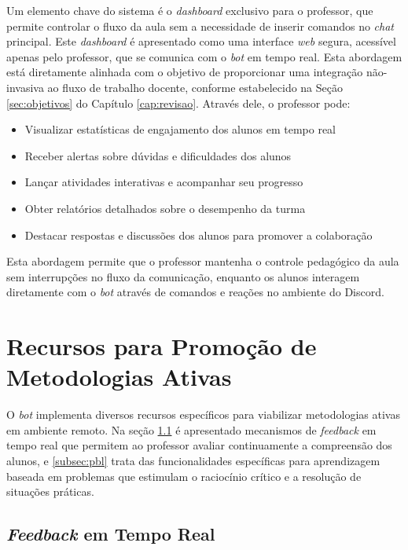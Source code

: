 Um elemento chave do sistema é o \textit{dashboard} exclusivo para o professor,
que permite controlar o fluxo da aula sem a necessidade de inserir comandos no
\textit{chat} principal. Este \textit{dashboard} é apresentado como uma
interface \textit{web} segura, acessível apenas pelo professor, que se comunica
com o \textit{bot} em tempo real. Esta abordagem está diretamente alinhada com o
objetivo de proporcionar uma integração não-invasiva ao fluxo de trabalho
docente, conforme estabelecido na Seção \ref{sec:objetivos} do Capítulo
\ref{cap:revisao}. Através dele, o professor pode:

\begin{itemize}
\item Visualizar estatísticas de engajamento dos alunos em tempo real
\item Receber alertas sobre dúvidas e dificuldades dos alunos
\item Lançar atividades interativas e acompanhar seu progresso
\item Obter relatórios detalhados sobre o desempenho da turma
\item Destacar respostas e discussões dos alunos para promover a colaboração
\end{itemize}

Esta abordagem permite que o professor mantenha o controle pedagógico da aula
sem interrupções no fluxo da comunicação, enquanto os alunos interagem
diretamente com o \textit{bot} através de comandos e reações no ambiente do
Discord.

\section{Recursos para Promoção de Metodologias Ativas}
\label{sec:recursos}

O \textit{bot} implementa diversos recursos específicos para viabilizar
metodologias ativas em ambiente remoto. Na seção \ref{subsec:feedback} é
apresentado mecanismos de \textit{feedback} em tempo real que permitem ao
professor avaliar continuamente a compreensão dos alunos, e \ref{subsec:pbl}
trata das funcionalidades específicas para aprendizagem baseada em problemas que
estimulam o raciocínio crítico e a resolução de situações práticas.

\subsection{\textit{Feedback} em Tempo Real}
\label{subsec:feedback}

